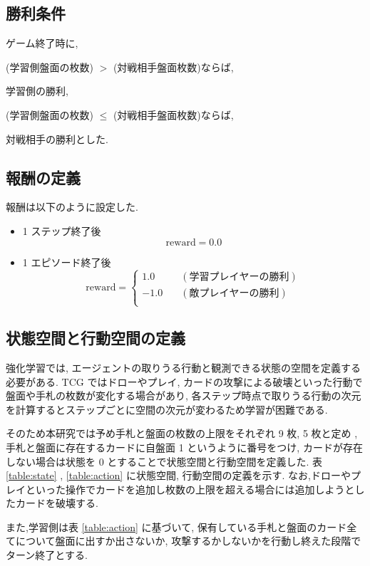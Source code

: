 \documentclass[twocolumn]{jarticle}     %
\begin{document}
\subsection{勝利条件}
ゲーム終了時に,\par
(学習側盤面の枚数) $>$ (対戦相手盤面枚数)ならば,\par
学習側の勝利, \par 
(学習側盤面の枚数) $\leq$ (対戦相手盤面枚数)ならば,\par
対戦相手の勝利とした.\par 

\subsection{報酬の定義}
報酬は以下のように設定した.\par
\begin{itemize}
  \item 1 ステップ終了後 
  \begin{equation*}
   \mathrm{reward} = 0.0  
  \end{equation*}
  \item 1 エピソード終了後
  \begin{equation*}
    \mathrm{reward} = 
    \left\{
      \begin{aligned}
          1.0 \quad & (学習プレイヤーの勝利) \\
          -1.0 \quad & (敵プレイヤーの勝利) \\
      \end{aligned}
      \right.
  \end{equation*} 
\end{itemize}


\subsection{状態空間と行動空間の定義}
強化学習では, エージェントの取りうる行動と観測できる状態の空間を定義する必要がある. 
TCG ではドローやプレイ, カードの攻撃による破壊といった行動で盤面や手札の枚数が変化する場合があり, 各ステップ時点で取りうる行動の次元を計算するとステップごとに空間の次元が変わるため学習が困難である.\par
そのため本研究では予め手札と盤面の枚数の上限をそれぞれ 9 枚, 5 枚と定め , 手札と盤面に存在するカードに自盤面 1 というように番号をつけ, カードが存在しない場合は状態を 0 とすることで状態空間と行動空間を定義した. 表 \ref{table:state} , \ref{table:action} に状態空間, 行動空間の定義を示す.
なお,ドローやプレイといった操作でカードを追加し枚数の上限を超える場合には追加しようとしたカードを破壊する. \par
また,学習側は表 \ref{table:action} に基づいて, 保有している手札と盤面のカード全てについて盤面に出すか出さないか, 攻撃するかしないかを行動し終えた段階でターン終了とする.
\end{document}
